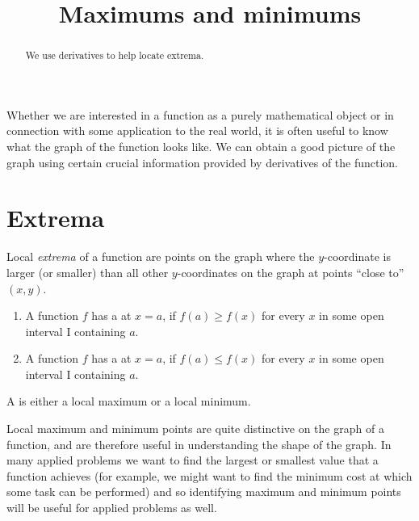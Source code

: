\documentclass{ximera}
\title[Dig-In]{Maximums and minimums}
\begin{document}
\begin{abstract}
We use derivatives to help locate extrema.  
\end{abstract}
\maketitle


Whether we are interested in a function as a purely mathematical
object or in connection with some application to the real world, it is
often useful to know what the graph of the function looks like. We can
obtain a good picture of the graph using certain crucial information
provided by derivatives of the function.

\section{Extrema}

Local \textit{extrema} of a function are points on the graph where the
$y$-coordinate is larger (or smaller) than all other $y$-coordinates
on the graph at points ``close to'' $(x,y)$. 

\begin{definition}\hfil{}
\begin{enumerate}
\item A function $f$ has a  at $x=a$, if $f(a)\ge
  f(x)$ for every $x$ in some open interval I containing $a$.
\item A function $f$ has a  at $x=a$, if $f(a)\le
  f(x)$ for every $x$  in some open interval I containing $a$.
\end{enumerate}
A  is either a local
maximum or a local minimum.
\end{definition}


Local maximum and minimum points are quite distinctive on the graph of
a function, and are therefore useful in understanding the shape of the
graph. In many applied problems we want to find the largest or
smallest value that a function achieves (for example, we might want
to find the minimum cost at which some task can be performed) and so
identifying maximum and minimum points will be useful for applied
problems as well.
\end{document}
